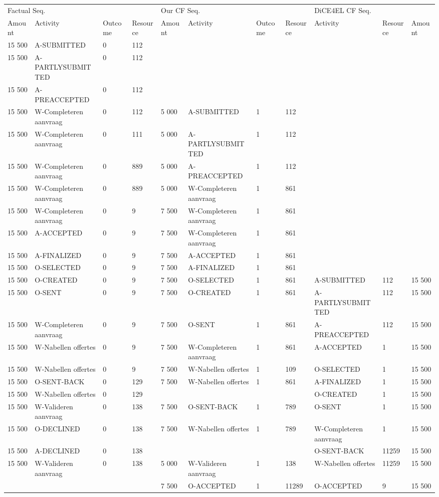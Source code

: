 \begin{tabular}{lllllllllll}
\toprule
\multicolumn{4}{l}{Factual Seq.} & \multicolumn{4}{l}{Our CF Seq.} & \multicolumn{3}{l}{DiCE4EL CF Seq.} \\
Amount & Activity & Outcome & Resource & Amount & Activity & Outcome & Resource & Activity & Resource & Amount \\
\midrule
15 500 & A-SUBMITTED & 0 & 112 &  &  &  &  &  &  &  \\
15 500 & A-PARTLYSUBMITTED & 0 & 112 &  &  &  &  &  &  &  \\
15 500 & A-PREACCEPTED & 0 & 112 &  &  &  &  &  &  &  \\
15 500 & W-Completeren aanvraag & 0 & 112 & 5 000 & A-SUBMITTED & 1 & 112 &  &  &  \\
15 500 & W-Completeren aanvraag & 0 & 111 & 5 000 & A-PARTLYSUBMITTED & 1 & 112 &  &  &  \\
15 500 & W-Completeren aanvraag & 0 & 889 & 5 000 & A-PREACCEPTED & 1 & 112 &  &  &  \\
15 500 & W-Completeren aanvraag & 0 & 889 & 5 000 & W-Completeren aanvraag & 1 & 861 &  &  &  \\
15 500 & W-Completeren aanvraag & 0 & 9 & 7 500 & W-Completeren aanvraag & 1 & 861 &  &  &  \\
15 500 & A-ACCEPTED & 0 & 9 & 7 500 & W-Completeren aanvraag & 1 & 861 &  &  &  \\
15 500 & A-FINALIZED & 0 & 9 & 7 500 & A-ACCEPTED & 1 & 861 &  &  &  \\
15 500 & O-SELECTED & 0 & 9 & 7 500 & A-FINALIZED & 1 & 861 &  &  &  \\
15 500 & O-CREATED & 0 & 9 & 7 500 & O-SELECTED & 1 & 861 & A-SUBMITTED & 112 & 15 500 \\
15 500 & O-SENT & 0 & 9 & 7 500 & O-CREATED & 1 & 861 & A-PARTLYSUBMITTED & 112 & 15 500 \\
15 500 & W-Completeren aanvraag & 0 & 9 & 7 500 & O-SENT & 1 & 861 & A-PREACCEPTED & 112 & 15 500 \\
15 500 & W-Nabellen offertes & 0 & 9 & 7 500 & W-Completeren aanvraag & 1 & 861 & A-ACCEPTED & 1 & 15 500 \\
15 500 & W-Nabellen offertes & 0 & 9 & 7 500 & W-Nabellen offertes & 1 & 109 & O-SELECTED & 1 & 15 500 \\
15 500 & O-SENT-BACK & 0 & 129 & 7 500 & W-Nabellen offertes & 1 & 861 & A-FINALIZED & 1 & 15 500 \\
15 500 & W-Nabellen offertes & 0 & 129 &  &  &  &  & O-CREATED & 1 & 15 500 \\
15 500 & W-Valideren aanvraag & 0 & 138 & 7 500 & O-SENT-BACK & 1 & 789 & O-SENT & 1 & 15 500 \\
15 500 & O-DECLINED & 0 & 138 & 7 500 & W-Nabellen offertes & 1 & 789 & W-Completeren aanvraag & 1 & 15 500 \\
15 500 & A-DECLINED & 0 & 138 &  &  &  &  & O-SENT-BACK & 11259 & 15 500 \\
15 500 & W-Valideren aanvraag & 0 & 138 & 5 000 & W-Valideren aanvraag & 1 & 138 & W-Nabellen offertes & 11259 & 15 500 \\
 &  &  &  & 7 500 & O-ACCEPTED & 1 & 11289 & O-ACCEPTED & 9 & 15 500 \\
\bottomrule
\end{tabular}
